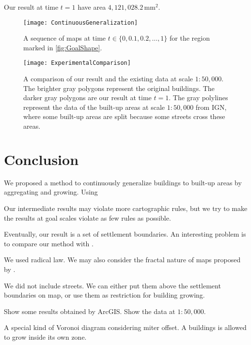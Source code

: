 Our result at time $t=1$ have area $4{,}121{,}028.2\,\mathrm{mm}^2$.









\begin{figure*}[tb]
	\centering
	\texttt{[image: ContinuousGeneralization]}
	\caption{A sequence of maps at time $t \in \{0, 0.1, 0.2, \dots, 1\}$
		for the region marked in \fig\ref{fig:GoalShape}.
	}
	\label{fig:ContinuousGeneralization}
\end{figure*}

\begin{figure*}[tb]
	\centering
	\texttt{[image: ExperimentalComparison]}
	\caption{A comparison of our result and the existing data at scale 
	$1:50{,}000$.
		The brighter gray polygons represent the original buildings.
		The darker gray polygons are our result at time $t=1$.
		The gray polylines represent the data of the built-up areas at scale 
		$1:50{,}000$ from IGN, where some built-up areas are split because some 
		streets cross these areas.
	}
	\label{fig:ExperimentalComparison}
\end{figure*}




\section{Conclusion}
\label{sec:Conclusion}

We proposed a method to continuously generalize buildings to built-up areas
by aggregating and growing.
Using 

Our intermediate results may violate more cartographic rules, but we try to 
make the results at goal scales violate as few rules as possible.


Eventually, our result is a set of settlement boundaries. An interesting 
problem is to compare our method with \citet{Chaudhry2008}.

We used radical law. We may also consider the fractal nature of maps proposed 
by \citet{Jiang2015}.

We did not include streets. We can either put them above the settlement 
boundaries on map, or use them as restriction for building growing.

Show some results obtained by ArcGIS.
Show the data at $1:50{,}000$.

A special kind of Voronoi diagram considering miter offset. A buildings is 
allowed to grow inside its own zone.

